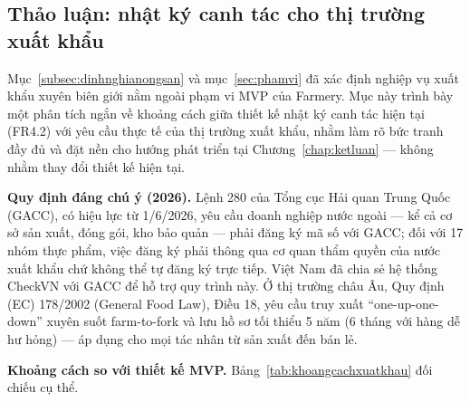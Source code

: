 
\subsection*{Thảo luận: nhật ký canh tác cho thị trường xuất khẩu}
\label{subsec:nhatkycanhtac-xuatkhau}

Mục~\ref{subsec:dinhnghianongsan} và mục~\ref{sec:phamvi} đã xác định nghiệp vụ xuất khẩu xuyên biên giới nằm ngoài phạm vi MVP của Farmery. Mục này trình bày một phân tích ngắn về khoảng cách giữa thiết kế nhật ký canh tác hiện tại (FR4.2) với yêu cầu thực tế của thị trường xuất khẩu, nhằm làm rõ bức tranh đầy đủ và đặt nền cho hướng phát triển tại Chương~\ref{chap:ketluan} --- không nhằm thay đổi thiết kế hiện tại.

\noindent\textbf{Quy định đáng chú ý (2026).} Lệnh 280 của Tổng cục Hải quan Trung Quốc (GACC), có hiệu lực từ 1/6/2026, yêu cầu doanh nghiệp nước ngoài --- kể cả cơ sở sản xuất, đóng gói, kho bảo quản --- phải đăng ký mã số với GACC; đối với 17 nhóm thực phẩm, việc đăng ký phải thông qua cơ quan thẩm quyền của nước xuất khẩu chứ không thể tự đăng ký trực tiếp. Việt Nam đã chia sẻ hệ thống CheckVN với GACC để hỗ trợ quy trình này. Ở thị trường châu Âu, Quy định (EC) 178/2002 (General Food Law), Điều 18, yêu cầu truy xuất ``one-up-one-down'' xuyên suốt farm-to-fork và lưu hồ sơ tối thiểu 5 năm (6 tháng với hàng dễ hư hỏng) --- áp dụng cho mọi tác nhân từ sản xuất đến bán lẻ.

\noindent\textbf{Khoảng cách so với thiết kế MVP.} Bảng~\ref{tab:khoangcachxuatkhau} đối chiếu cụ thể.

